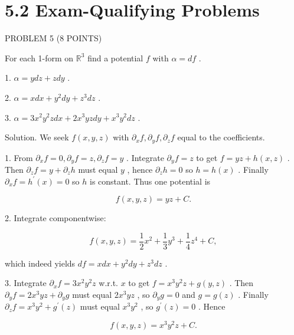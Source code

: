 \documentclass[10pt]{article}
\begin{document}
\section*{5.2 Exam-Qualifying Problems}

PROBLEM 5 (8 POINTS)

For each 1-form on \({\mathbb{R}}^{3}\) find a potential \(f\) with \(\alpha  = {df}\) .

1. \(\alpha  = {ydz} + {zdy}\) .

2. \(\alpha  = {xdx} + {y}^{2}{dy} + {z}^{3}{dz}\) .

3. \(\alpha  = 3{x}^{2}{y}^{2}{zdx} + 2{x}^{3}{yzdy} + {x}^{3}{y}^{2}{dz}\) .

Solution. We seek \(f\left( {x,y,z}\right)\) with \({\partial }_{x}f,{\partial }_{y}f,{\partial }_{z}f\) equal to the coefficients.

1. From \({\partial }_{x}f = 0,{\partial }_{y}f = z,{\partial }_{z}f = y\) . Integrate \({\partial }_{y}f = z\) to get \(f = {yz} + h\left( {x,z}\right)\) . Then \({\partial }_{z}f = y + {\partial }_{z}h\) must equal \(y\) , hence \({\partial }_{z}h = 0\) so \(h = h\left( x\right)\) . Finally \({\partial }_{x}f = {h}^{\prime }\left( x\right)  = 0\) so \(h\) is constant. Thus one potential is

\[
f\left( {x,y,z}\right)  = {yz} + C.
\]

2. Integrate componentwise:

\[
f\left( {x,y,z}\right)  = \frac{1}{2}{x}^{2} + \frac{1}{3}{y}^{3} + \frac{1}{4}{z}^{4} + C,
\]

which indeed yields \({df} = {xdx} + {y}^{2}{dy} + {z}^{3}{dz}\) .

3. Integrate \({\partial }_{x}f = 3{x}^{2}{y}^{2}z\) w.r.t. \(x\) to get \(f = {x}^{3}{y}^{2}z + g\left( {y,z}\right)\) . Then \({\partial }_{y}f = 2{x}^{3}{yz} + {\partial }_{y}g\) must equal \(2{x}^{3}{yz}\) , so \({\partial }_{y}g = 0\) and \(g = g\left( z\right)\) . Finally \({\partial }_{z}f = {x}^{3}{y}^{2} + {g}^{\prime }\left( z\right)\) must equal \({x}^{3}{y}^{2}\) , so \({g}^{\prime }\left( z\right)  = 0\) . Hence

\[
f\left( {x,y,z}\right)  = {x}^{3}{y}^{2}z + C.
\]
\end{document}
